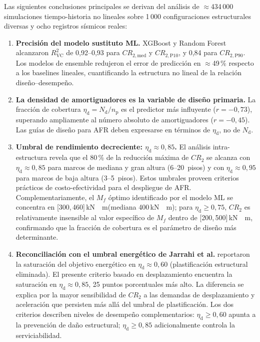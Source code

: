 \documentclass[preprint,12pt,authoryear]{elsarticle}
\newcommand{\CR}[1]{CR_{2,\text{#1}}}
\newcommand{\Rsq}{R^{2}_{\mathrm{VC}}}
\newcommand{\nd}{N_{\mathrm{d}}}
\newcommand{\np}{n_{\mathrm{p}}}              %
\newcommand{\etad}{\eta_{\mathrm{d}}}
\newcommand{\Mf}{M_{\!f}}
\newcommand{\KM}{\,\si{kN{\cdot}m}}
\begin{document}
Las siguientes conclusiones principales se derivan del análisis de
$\approx$434\,000 simulaciones tiempo-historia no lineales sobre 1\,000
configuraciones estructurales diversas y ocho registros sísmicos reales:

\begin{enumerate}

\item \textbf{Precisión del modelo sustituto ML.}
XGBoost y Random Forest alcanzaron $\Rsq$ de 0{,}92--0{,}93 para $\CR{med}$ y
$\CR{P10}$, y 0{,}84 para $\CR{P90}$. Los modelos de ensemble redujeron el error
de predicción en $\approx$49\,\% respecto a los baselines lineales, cuantificando
la estructura no lineal de la relación diseño--desempeño.

\item \textbf{La densidad de amortiguadores es la variable de diseño primaria.}
La fracción de cobertura $\etad = \nd/\np$ es el predictor más influyente
($r = -0{,}73$), superando ampliamente al número absoluto de amortiguadores
($r = -0{,}45$). Las guías de diseño para AFR deben expresarse en términos de
$\etad$, no de $\nd$.

\item \textbf{Umbral de rendimiento decreciente: $\etad \approx 0{,}85$.}
El análisis intra-estructura revela que el 80\,\% de la reducción máxima de
$CR_2$ se alcanza con $\etad \approx 0{,}85$ para marcos de mediana y gran
altura (6--20~pisos) y con $\etad \approx 0{,}95$ para marcos de baja altura
(3--5~pisos). Estos umbrales proveen criterios prácticos de costo-efectividad
para el despliegue de AFR. Complementariamente, el $\Mf$ óptimo identificado
por el modelo ML se concentra en [300,\,460]\KM (mediana 400\KM); para
$\etad \geq 0{,}75$, $CR_2$ es relativamente insensible al valor específico
de $\Mf$ dentro de [200,\,500]\KM, confirmando que la fracción de cobertura
es el parámetro de diseño más determinante.

\item \textbf{Reconciliación con el umbral energético de Jarrahi et al.}
\citet{Jarrahi2020sdee} reportaron la saturación del objetivo energético en
$\etad \approx 0{,}60$ (plastificación estructural eliminada). El presente
criterio basado en desplazamiento encuentra la saturación en $\etad \approx
0{,}85$, 25 puntos porcentuales más alto. La diferencia se explica por la mayor
sensibilidad de $CR_2$ a las demandas de desplazamiento y aceleración que
persisten más allá del umbral de plastificación. Los dos criterios describen
niveles de desempeño complementarios: $\etad \geq 0{,}60$ apunta a la
prevención de daño estructural; $\etad \geq 0{,}85$ adicionalmente controla
la serviciabilidad.


\end{enumerate}
\end{document}
